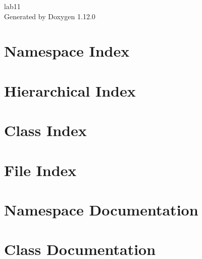 \documentclass[twoside]{book}
\newcommand{\+}{\discretionary{\mbox{\scriptsize$\hookleftarrow$}}{}{}}
\newcommand{\clearemptydoublepage}{%
    \newpage{\pagestyle{empty}\cleardoublepage}%
  }
\begin{document}
  \raggedbottom
    \hypersetup{pageanchor=false,
                bookmarksnumbered=true,
                pdfencoding=unicode
               }
  \begin{titlepage}
  \vspace*{7cm}
  \begin{center}%
  {\Large lab11}\\
  \vspace*{1cm}
  {\large Generated by Doxygen 1.12.0}\\
  \end{center}
  \end{titlepage}
  \clearemptydoublepage
  \tableofcontents
  \clearemptydoublepage
  \hypersetup{pageanchor=true}
\chapter{Namespace Index}

\chapter{Hierarchical Index}

\chapter{Class Index}

\chapter{File Index}

\chapter{Namespace Documentation}

\chapter{Class Documentation}

















\end{document}
